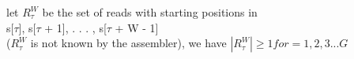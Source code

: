 \documentclass[preview]{standalone}
\begin{document}
\begin{center}
let $R^W_{\tau}$  be the set of reads with starting positions in\\ s[$\tau$], s[$\tau$ + 1], . . . , s[$\tau$ + W - 1] \\($R^W_{\tau}$ is not known by the assembler), we have $|R^W_{\tau}| \ge 1 for $\tau$ = 1,2,3...G $
\end{center}
\end{document}
